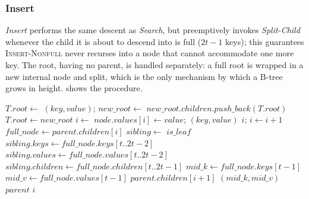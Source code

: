 \documentclass[sigconf]{acmart}
\begin{document}
\subsubsection{Insert}
\textit{Insert} performs the same descent as \textit{Search}, but preemptively invokes \textit{Split-Child} whenever the child it is about to descend into is full ($2t-1$ keys); this guarantees \textsc{Insert-Nonfull} never recurses into a node that cannot accommodate one more key. The root, having no parent, is handled separately: a full root is wrapped in a new internal node and split, which is the only mechanism by which a B-tree grows in height.  shows the procedure. 

\begin{algorithm}[tbp]
\caption{B-Tree Insert Algorithm}
\label{alg:btree-insert}
\begin{algorithmic}[1]
        \State $T.root \gets$  $(key, value)$; \Return
    \EndIf
        \State $new\_root \gets$ 
        \State $new\_root.children.push\_back(T.root)$
        \State {}
        \State $T.root \gets new\_root$
    \EndIf
    \State \Return {}
\EndProcedure
\Statex
{}
    \State $i \gets$ 
        \State $node.values[i] \gets value$; \Return
    \EndIf
        \State {} $(key, value)$  $i$; \Return
    \EndIf
        \State {}
         \State $i \gets i + 1$ \EndIf
    \EndIf
    \State \Return {}
\EndProcedure
\Statex
{}
    \State $full\_node \gets parent.children[i]$
    \State $sibling \gets$  $is\_leaf$ 
    \State $sibling.keys \gets full\_node.keys[t .. 2t - 2]$
    \State $sibling.values \gets full\_node.values[t .. 2t - 2]$
        \State $sibling.children \gets full\_node.children[t .. 2t - 1]$
    \EndIf
    \State $mid\_k \gets full\_node.keys[t - 1]$
    \State $mid\_v \gets full\_node.values[t - 1]$
    \State {}
    \State {} $parent.children[i+1]$
    \State {} $(mid\_k, mid\_v)$  $parent$  $i$
\EndProcedure
\end{algorithmic}
\end{algorithm}
\end{document}
